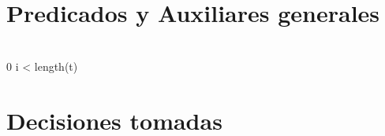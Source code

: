 \documentclass[a4paper]{article}
\begin{document}
\section{Predicados y Auxiliares generales}


		

		{\\
			0 \leq  i < length(t)\\
		}
		
	
		
        
		
\section{Decisiones tomadas}
\end{document}
